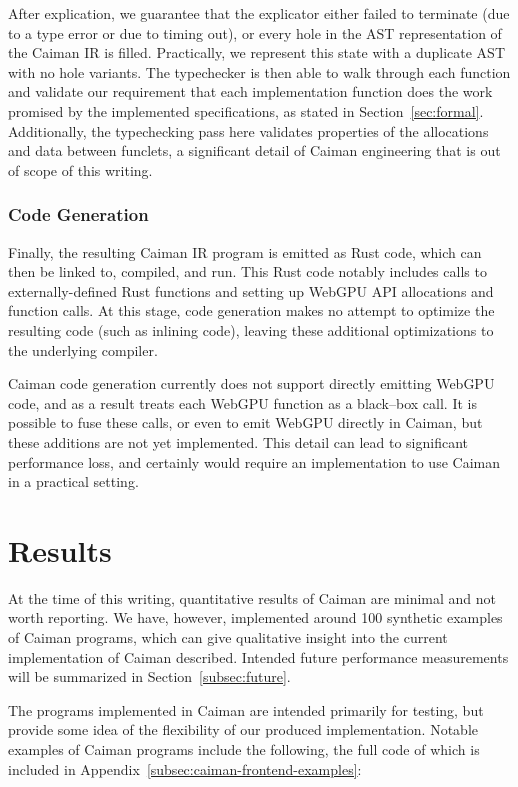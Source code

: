 After explication, we guarantee that the explicator either failed to terminate (due to a type error or due to timing out), or every hole in the AST representation of the Caiman IR is filled.  Practically, we represent this state with a duplicate AST with no hole variants.  The typechecker is then able to walk through each function and validate our requirement that each implementation function does the work promised by the implemented specifications, as stated in Section~\ref{sec:formal}.  Additionally, the typechecking pass here validates properties of the allocations and data between funclets, a significant detail of Caiman engineering that is out of scope of this writing.

\subsubsection{Code Generation}
\label{subsec:generation}

Finally, the resulting Caiman IR program is emitted as Rust code, which can then be linked to, compiled, and run.  This Rust code notably includes calls to externally-defined Rust functions and setting up WebGPU API allocations and function calls.  At this stage, code generation makes no attempt to optimize the resulting code (such as inlining code), leaving these additional optimizations to the underlying compiler.

Caiman code generation currently does not support directly emitting WebGPU code, and as a result treats each WebGPU function as a black--box call.  It is possible to fuse these calls, or even to emit WebGPU directly in Caiman, but these additions are not yet implemented.  This detail can lead to significant performance loss, and certainly would require an implementation to use Caiman in a practical setting.

\section{Results}
\label{sec:results}

At the time of this writing, quantitative results of Caiman are minimal and not worth reporting.  We have, however, implemented around 100 synthetic examples of Caiman programs, which can give qualitative insight into the current implementation of Caiman described.  Intended future performance measurements will be summarized in Section~\ref{subsec:future}.

The programs implemented in Caiman are intended primarily for testing, but provide some idea of the flexibility of our produced implementation.  Notable examples of Caiman programs include the following, the full code of which is included in Appendix~\ref{subsec:caiman-frontend-examples}:

